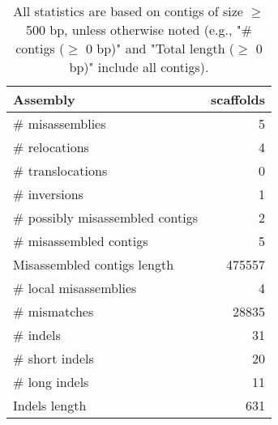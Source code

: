 \documentclass[12pt,a4paper]{article}
\begin{document}
\begin{table}[ht]
\begin{center}
\caption{All statistics are based on contigs of size $\geq$ 500 bp, unless otherwise noted (e.g., "\# contigs ($\geq$ 0 bp)" and "Total length ($\geq$ 0 bp)" include all contigs).}
\begin{tabular}{|l*{1}{|r}|}
\hline
Assembly & scaffolds \\ \hline
\# misassemblies & 5 \\ \hline
\hspace{5mm}\# relocations & 4 \\ \hline
\hspace{5mm}\# translocations & 0 \\ \hline
\hspace{5mm}\# inversions & 1 \\ \hline
\# possibly misassembled contigs & 2 \\ \hline
\# misassembled contigs & 5 \\ \hline
Misassembled contigs length & 475557 \\ \hline
\# local misassemblies & 4 \\ \hline
\# mismatches & 28835 \\ \hline
\# indels & 31 \\ \hline
\hspace{5mm}\# short indels & 20 \\ \hline
\hspace{5mm}\# long indels & 11 \\ \hline
Indels length & 631 \\ \hline
\end{tabular}
\end{center}
\end{table}
\end{document}
